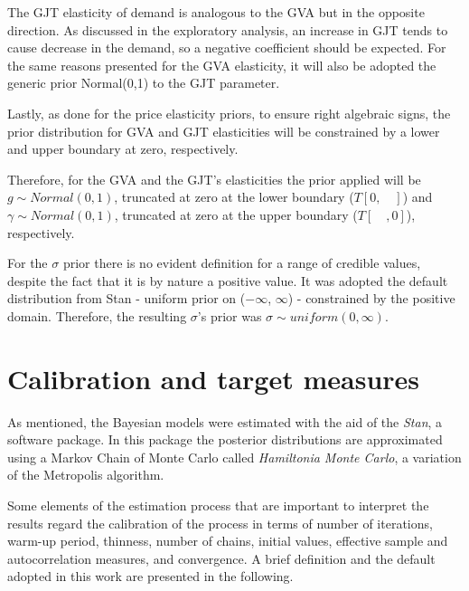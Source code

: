 The GJT elasticity of demand is analogous to the GVA but in the opposite direction. As discussed in the exploratory analysis, an increase in GJT tends to cause decrease in the demand, so a negative coefficient should be expected. For the same reasons presented for the GVA elasticity, it will also be adopted the generic prior Normal(0,1) to the GJT parameter.

Lastly, as done for the price elasticity priors, to ensure right algebraic signs, the prior distribution for GVA and GJT elasticities will be constrained by a lower and upper boundary at zero, respectively. 


Therefore, for the GVA and the GJT's elasticities the prior applied will be $g \sim Normal(0,1)$, truncated at zero at the lower boundary ($T[0, \quad ]$) and $\gamma \sim Normal(0,1)$, truncated at zero at the upper boundary ($T[ \quad , 0]$), respectively. 

For the $\sigma$ prior there is no evident definition for a range of credible values, despite the fact that it is by nature a positive value. It was adopted the default distribution from Stan - uniform prior on ($-\infty$, $\infty$) \citep{stan-manual} - constrained by the positive domain. Therefore, the resulting $\sigma$'s prior was $\sigma \sim uniform(0,\infty)$.



\section{Calibration and target measures}

As mentioned, the Bayesian models were estimated with the aid of the \textit{Stan}, a software package. In this package the posterior distributions are approximated using a Markov Chain of Monte Carlo called \textit{Hamiltonia Monte Carlo}, a variation of the Metropolis algorithm.

Some elements of the estimation process that are important to interpret the results regard the calibration of the process in terms of number of iterations, warm-up period, thinness, number of chains, initial values, effective sample and autocorrelation measures, and convergence. A brief definition and the default adopted in this work are presented in the following.

